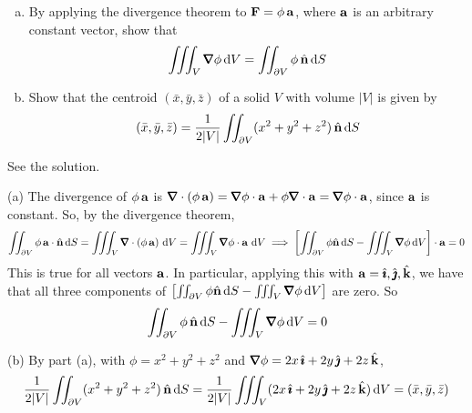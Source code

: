 \begin{solution}
\end{solution}

\goodbreak
\begin{question}
\begin{enumerate}[(a)]
\item
By applying the divergence theorem to $\mathbf{F}=\phi\,\mathbf{a}$,
where $\mathbf{a}$ is an arbitrary constant vector, show that
\begin{equation*}
\tripInt_V \vnabla\phi\,\dee{V}=\dblInt_{\partial V}\phi\,\hn\,\dee{S}
\end{equation*}
\item 
Show that the centroid $(\bar x,\bar y,\bar z)$ of a solid $V$
with volume $|V|$ is given by
\begin{equation*}
(\bar x,\bar y,\bar z)=\frac{1}{2|V|}\iint_{\partial V} (x^2+y^2+z^2)\,\hat{\mathbf{n}}\,\mathrm{d}S
\end{equation*}
\end{enumerate}
\end{question}

%

\begin{answer} 
See the solution.
\end{answer}

\begin{solution} 
(a) The divergence of $\phi\,\mathbf{a}$ is 
$\vnabla\cdot(\phi\,\va)
=\vnabla\phi\cdot\va+\phi\vnabla\cdot\va=\vnabla\phi\cdot\va$, since $\mathbf{a}$ is
constant. So, by
the divergence theorem, 
\begin{equation*}
\dblInt_{\partial V}\phi\,\va\cdot\hn\,\dee{S}
=\tripInt_V\vnabla\cdot(\phi\,\va)\ \dee{V}
=\tripInt_V \vnabla\phi\cdot\va\ \dee{V}
\implies \left[\dblInt_{\partial V}\phi\hn\,\dee{S}
         -\tripInt_V \vnabla\phi\,\dee{V}\right]\cdot\va=0
\end{equation*}
This is true for all vectors $\mathbf{a}$. In particular, applying this with
$\mathbf{a}=\hat{\pmb{\imath}},\hat{\pmb{\jmath}},\hat{\mathbf{k}}$, we have that all three components of 
$\left[\dblInt_{\partial V}\phi\hn\,\dee{S}
         -\tripInt_V \vnabla\phi\,\dee{V}\right]$ are zero.
So 
\begin{equation*}
\dblInt_{\partial V}\phi\,\hn\,\dee{S}-\tripInt_V \vnabla\phi\,\dee{V}=0
\end{equation*}

(b) By part (a), with $\phi=x^2+y^2+z^2$ and 
$\vnabla\phi = 2x\,\hi+2y\,\hj+2z\,\hk$,
\begin{equation*}
\frac{1}{2|V|}\iint_{\partial V} (x^2+y^2+z^2)\,\hat{\mathbf{n}}\,\mathrm{d}S
=\frac{1}{2|V|} \iiint_V (2x\,\hat{\pmb{\imath}}+2y\,\hat{\pmb{\jmath}}+2z\,\hat{\mathbf{k}})\,\mathrm{d}V
=(\bar x,\bar y,\bar z)
\end{equation*}
\end{solution}


